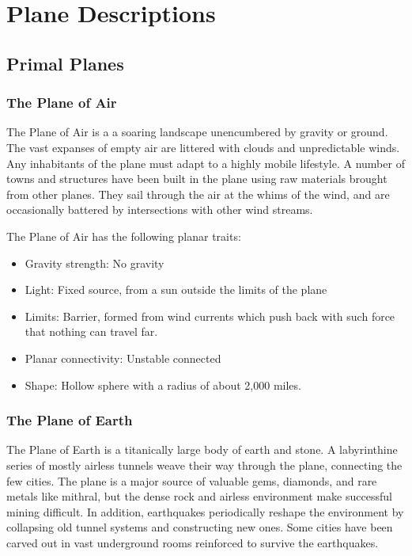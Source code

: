 
\section{Plane Descriptions}

  \subsection{Primal Planes}

    \subsubsection{The Plane of Air}
      The Plane of Air is a a soaring landscape unencumbered by gravity or ground.
      The vast expanses of empty air are littered with clouds and unpredictable winds.
      Any inhabitants of the plane must adapt to a highly mobile lifestyle.
      A number of towns and structures have been built in the plane using raw materials brought from other planes.
      They sail through the air at the whims of the wind, and are occasionally battered by intersections with other wind streams.

      The Plane of Air has the following planar traits:
      \begin{itemize}
        \item Gravity strength: No gravity
        \item Light: Fixed source, from a sun outside the limits of the plane
        \item Limits: Barrier, formed from wind currents which push back with such force that nothing can travel far.
        \item Planar connectivity: Unstable connected
        \item Shape: Hollow sphere with a radius of about 2,000 miles.
      \end{itemize}

    \subsubsection{The Plane of Earth}
      The Plane of Earth is a titanically large body of earth and stone.
      A labyrinthine series of mostly airless tunnels weave their way through the plane, connecting the few cities.
      The plane is a major source of valuable gems, diamonds, and rare metals like mithral, but the dense rock and airless environment make successful mining difficult.
      In addition, earthquakes periodically reshape the environment by collapsing old tunnel systems and constructing new ones.
      Some cities have been carved out in vast underground rooms reinforced to survive the earthquakes.

